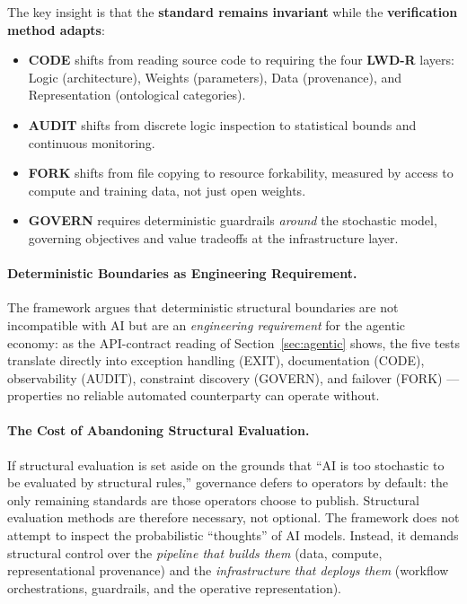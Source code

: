 \documentclass{article}
\theoremstyle{definition}
\begin{document}
The key insight is that the \textbf{standard remains invariant} while the \textbf{verification method adapts}:

\begin{itemize}[noitemsep]
    \item \textbf{CODE} shifts from reading source code to requiring the four \textbf{LWD-R} layers: Logic (architecture), Weights (parameters), Data (provenance), and Representation (ontological categories).
    \item \textbf{AUDIT} shifts from discrete logic inspection to statistical bounds and continuous monitoring.
    \item \textbf{FORK} shifts from file copying to resource forkability, measured by access to compute and training data, not just open weights.
    \item \textbf{GOVERN} requires deterministic guardrails \textit{around} the stochastic model, governing objectives and value tradeoffs at the infrastructure layer.
\end{itemize}

\paragraph{Deterministic Boundaries as Engineering Requirement.} The framework argues that deterministic structural boundaries are not incompatible with AI but are an \textit{engineering requirement} for the agentic economy: as the API-contract reading of Section~\ref{sec:agentic} shows, the five tests translate directly into exception handling (EXIT), documentation (CODE), observability (AUDIT), constraint discovery (GOVERN), and failover (FORK) --- properties no reliable automated counterparty can operate without.

\paragraph{The Cost of Abandoning Structural Evaluation.} If structural evaluation is set aside on the grounds that ``AI is too stochastic to be evaluated by structural rules,'' governance defers to operators by default: the only remaining standards are those operators choose to publish. Structural evaluation methods are therefore necessary, not optional. The framework does not attempt to inspect the probabilistic ``thoughts'' of AI models. Instead, it demands structural control over the \textit{pipeline that builds them} (data, compute, representational provenance) and the \textit{infrastructure that deploys them} (workflow orchestrations, guardrails, and the operative representation).
\end{document}
